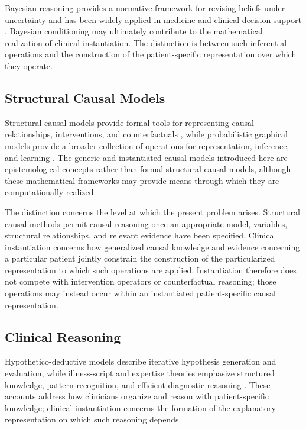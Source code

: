 \documentclass[11pt]{article}
\begin{document}
Bayesian reasoning provides a normative framework for revising beliefs under uncertainty and has been widely applied in medicine and clinical decision support \parencite{quintela-del-rio_bayesian_2019,kinney_bayesian_2021,de_grooth_bayes_2024}. Bayesian conditioning may ultimately contribute to the mathematical realization of clinical instantiation. The distinction is between such inferential operations and the construction of the patient-specific representation over which they operate.

\subsection{Structural Causal Models}
Structural causal models provide formal tools for representing causal relationships, interventions, and counterfactuals \parencite{pearl_causality_2013}, while probabilistic graphical models provide a broader collection of operations for representation, inference, and learning \parencite{koller_probabilistic_2009}. The generic and instantiated causal models introduced here are epistemological concepts rather than formal structural causal models, although these mathematical frameworks may provide means through which they are computationally realized.

The distinction concerns the level at which the present problem arises. Structural causal methods permit causal reasoning once an appropriate model, variables, structural relationships, and relevant evidence have been specified. Clinical instantiation concerns how generalized causal knowledge and evidence concerning a particular patient jointly constrain the construction of the particularized representation to which such operations are applied. Instantiation therefore does not compete with intervention operators or counterfactual reasoning; those operations may instead occur within an instantiated patient-specific causal representation.

\subsection{Clinical Reasoning}

Hypothetico-deductive models describe iterative hypothesis generation and evaluation, while illness-script and expertise theories emphasize structured knowledge, pattern recognition, and efficient diagnostic reasoning \parencite{elstein_medical_1978,schmidt_cognitive_1990,norman_research_2005,feltovich_issues_1984}. These accounts address how clinicians organize and reason with patient-specific knowledge; clinical instantiation concerns the formation of the explanatory representation on which such reasoning depends.
\end{document}
